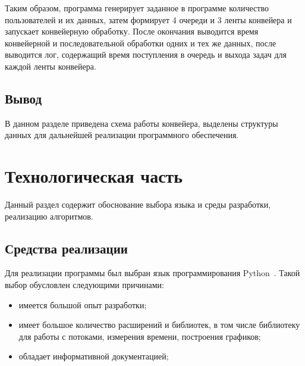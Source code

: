 \documentclass[12pt]{report}
\begin{document}
    Таким образом, программа генерирует заданное в программе количество пользователей и их данных, затем формирует 4 очереди и 3 ленты конвейера и запускает конвейерную обработку. После окончания выводится время конвейерной и последовательной обработки одних и тех же данных, после выводится лог, содержащий время поступления в очередь и выхода задач для каждой ленты конвейера.
    
    
    \section{Вывод}
    В данном разделе приведена схема работы конвейера, выделены структуры данных для дальнейшей реализации программного обеспечения. 
    
    \chapter{Технологическая часть}
    Данный раздел содержит обоснование выбора языка и среды разработки, реализацию алгоритмов.
    
    \section{Средства реализации}
    Для реализации программы был выбран язык программирования Python~\cite{python}. Такой выбор обусловлен следующими причинами:
    \begin{itemize}
    	\item имеется большой опыт разработки;
    	\item имеет большое количество расширений и библиотек, в том числе библиотеку для работы с потоками, измерения времени, построения графиков;
    	\item обладает информативной документацией;
    \end{itemize}
    
\end{document}
